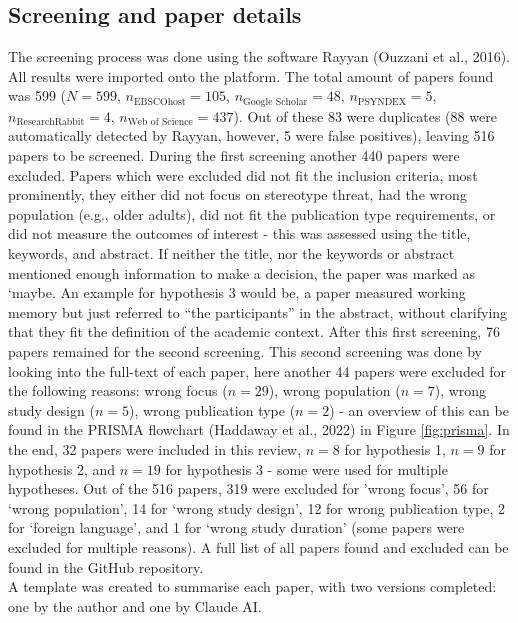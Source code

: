 \documentclass[
  stu,floatsintext]{apa7}
\begin{document}
\subsection{Screening and paper details}\label{screening-and-paper-details}

The screening process was done using the software Rayyan (Ouzzani et al., 2016). All results were imported onto the platform.
The total amount of papers found was 599 (\(N = 599\), \(n_{\text{EBSCOhost}} = 105\), \(n_{\text{Google Scholar}} = 48\), \(n_{\text{PSYNDEX}} = 5\), \(n_{\text{ResearchRabbit}} = 4\), \(n_{\text{Web of Science}} = 437\)). Out of these 83 were duplicates (88 were automatically detected by Rayyan, however, 5 were false positives), leaving 516 papers to be screened. During the first screening another 440 papers were excluded.
Papers which were excluded did not fit the inclusion criteria, most prominently, they either did not focus on stereotype threat, had the wrong population (e.g., older adults), did not fit the publication type requirements, or did not measure the outcomes of interest - this was assessed using the title, keywords, and abstract. If neither the title, nor the keywords or abstract mentioned enough information to make a decision, the paper was marked as `maybe.
An example for hypothesis 3 would be, a paper measured working memory but just referred to ``the participants'' in the abstract, without clarifying that they fit the definition of the academic context. After this first screening, 76 papers remained for the second screening.
This second screening was done by looking into the full-text of each paper, here another 44 papers were excluded for the following reasons: wrong focus (\(n = 29\)), wrong population (\(n = 7\)), wrong study design (\(n = 5\)), wrong publication type (\(n = 2\)) - an overview of this can be found in the PRISMA flowchart (Haddaway et al., 2022) in Figure \ref{fig:prisma}.
In the end, 32 papers were included in this review, \(n = 8\) for hypothesis 1, \(n = 9\) for hypothesis 2, and \(n = 19\) for hypothesis 3 - some were used for multiple hypotheses. Out of the 516 papers, 319 were excluded for 'wrong focus', 56 for `wrong population', 14 for `wrong study design', 12 for wrong publication type, 2 for `foreign language', and 1 for `wrong study duration' (some papers were excluded for multiple reasons). A full list of all papers found and excluded can be found in the GitHub repository.\\
A template was created to summarise each paper, with two versions completed: one by the author and one by Claude AI.
\end{document}
